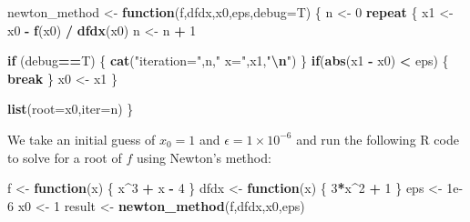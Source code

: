 \documentclass[
]{article}
\newenvironment{Shaded}{\begin{snugshade}}{\end{snugshade}}
\newcommand{\AttributeTok}[1]{\textcolor[rgb]{0.13,0.29,0.53}{#1}}
\newcommand{\ControlFlowTok}[1]{\textcolor[rgb]{0.13,0.29,0.53}{\textbf{#1}}}
\newcommand{\DecValTok}[1]{\textcolor[rgb]{0.00,0.00,0.81}{#1}}
\newcommand{\FloatTok}[1]{\textcolor[rgb]{0.00,0.00,0.81}{#1}}
\newcommand{\FunctionTok}[1]{\textcolor[rgb]{0.13,0.29,0.53}{\textbf{#1}}}
\newcommand{\NormalTok}[1]{#1}
\newcommand{\OtherTok}[1]{\textcolor[rgb]{0.56,0.35,0.01}{#1}}
\newcommand{\SpecialCharTok}[1]{\textcolor[rgb]{0.81,0.36,0.00}{\textbf{#1}}}
\newcommand{\StringTok}[1]{\textcolor[rgb]{0.31,0.60,0.02}{#1}}
\begin{document}
\begin{Shaded}
\begin{Highlighting}[]
\NormalTok{newton\_method }\OtherTok{\textless{}{-}} \ControlFlowTok{function}\NormalTok{(f,dfdx,x0,eps,}\AttributeTok{debug=}\NormalTok{T)}
\NormalTok{\{}
\NormalTok{  n }\OtherTok{\textless{}{-}} \DecValTok{0}
  \ControlFlowTok{repeat}
\NormalTok{  \{}
\NormalTok{    x1 }\OtherTok{\textless{}{-}}\NormalTok{ x0 }\SpecialCharTok{{-}} \FunctionTok{f}\NormalTok{(x0) }\SpecialCharTok{/} \FunctionTok{dfdx}\NormalTok{(x0)}
\NormalTok{    n }\OtherTok{\textless{}{-}}\NormalTok{ n }\SpecialCharTok{+} \DecValTok{1}
   
    \ControlFlowTok{if}\NormalTok{ (debug}\SpecialCharTok{==}\NormalTok{T) \{ }\FunctionTok{cat}\NormalTok{(}\StringTok{"iteration="}\NormalTok{,n,}\StringTok{" x="}\NormalTok{,x1,}\StringTok{"}\SpecialCharTok{\textbackslash{}n}\StringTok{"}\NormalTok{) \}}
    \ControlFlowTok{if}\NormalTok{(}\FunctionTok{abs}\NormalTok{(x1 }\SpecialCharTok{{-}}\NormalTok{ x0) }\SpecialCharTok{\textless{}}\NormalTok{ eps)}
\NormalTok{    \{}
      \ControlFlowTok{break}
\NormalTok{    \}}
\NormalTok{    x0 }\OtherTok{\textless{}{-}}\NormalTok{ x1}
\NormalTok{  \}}
  
  \FunctionTok{list}\NormalTok{(}\AttributeTok{root=}\NormalTok{x0,}\AttributeTok{iter=}\NormalTok{n)}
\NormalTok{\}}
\end{Highlighting}
\end{Shaded}

We take an initial guess of \(x_0 = 1\) and
\(\epsilon = 1 \times 10^{-6}\) and run the following R code to solve
for a root of \(f\) using Newton's method:

\begin{Shaded}
\begin{Highlighting}[]
\NormalTok{f }\OtherTok{\textless{}{-}} \ControlFlowTok{function}\NormalTok{(x) \{ x}\SpecialCharTok{\^{}}\DecValTok{3} \SpecialCharTok{+}\NormalTok{ x }\SpecialCharTok{{-}} \DecValTok{4}\NormalTok{ \}}
\NormalTok{dfdx }\OtherTok{\textless{}{-}} \ControlFlowTok{function}\NormalTok{(x) \{ }\DecValTok{3}\SpecialCharTok{*}\NormalTok{x}\SpecialCharTok{\^{}}\DecValTok{2} \SpecialCharTok{+} \DecValTok{1}\NormalTok{ \}}
\NormalTok{eps }\OtherTok{\textless{}{-}} \FloatTok{1e{-}6}
\NormalTok{x0 }\OtherTok{\textless{}{-}} \DecValTok{1}
\NormalTok{result }\OtherTok{\textless{}{-}} \FunctionTok{newton\_method}\NormalTok{(f,dfdx,x0,eps)}
\end{Highlighting}
\end{Shaded}
\end{document}
